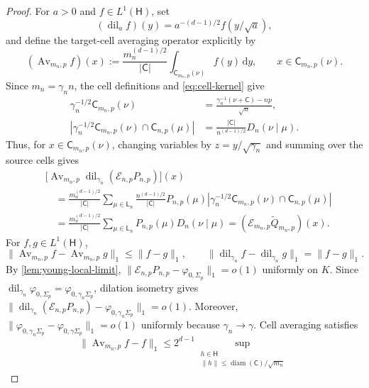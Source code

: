 \documentclass[11pt]{article}
\theoremstyle{remark}
\theoremstyle{plain}
\newcommand{\dd}{\mathrm d}
\begin{document}
\begin{proof}
For \(a>0\) and \(f\in L^1(\mathsf H)\), set
\[
  (\operatorname{dil}_a f)(y)=a^{-(d-1)/2}f(y/\sqrt a),
\]
and define the target-cell averaging operator explicitly by
\[
  (\operatorname{Av}_{m_n,p}f)(x)
  :=\frac{m_n^{(d-1)/2}}{|\mathsf C|}
   \int_{\mathsf C_{m_n,p}(\nu)}f(y)\,\dd y,
  \qquad x\in\mathsf C_{m_n,p}(\nu).
\]
Since \(m_n=\gamma_n n\), the cell definitions and
\eqref{eq:cell-kernel} give
\[
\begin{aligned}
  \gamma_n^{-1/2}\mathsf C_{m_n,p}(\nu)
  &=\frac{\gamma_n^{-1}(\nu+\mathsf C)-np}{\sqrt n},\\
  \left|\gamma_n^{-1/2}\mathsf C_{m_n,p}(\nu)
       \cap\mathsf C_{n,p}(\mu)\right|
  &=\frac{|\mathsf C|}{n^{(d-1)/2}}D_n(\nu\mid\mu).
\end{aligned}
\]
Thus, for \(x\in\mathsf C_{m_n,p}(\nu)\), changing variables
by \(z=y/\sqrt{\gamma_n}\) and summing over the source cells gives
\begin{equation}\label{eq:rounding-intertwining}
\begin{aligned}
 &\bigl[\operatorname{Av}_{m_n,p}\operatorname{dil}_{\gamma_n}
   (\mathcal E_{n,p}P_{n,p})\bigr](x)\\
 &\quad=\frac{m_n^{(d-1)/2}}{|\mathsf C|}
   \sum_{\mu\in\mathsf L_n}\frac{n^{(d-1)/2}}{|\mathsf C|}
   P_{n,p}(\mu)
   \left|\gamma_n^{-1/2}\mathsf C_{m_n,p}(\nu)
        \cap\mathsf C_{n,p}(\mu)\right|\\
 &\quad=\frac{m_n^{(d-1)/2}}{|\mathsf C|}
   \sum_{\mu\in\mathsf L_n}P_{n,p}(\mu)D_n(\nu\mid\mu)
  =(\mathcal E_{m_n,p}\widetilde Q_{m_n,p})(x).
\end{aligned}
\end{equation}
For \(f,g\in L^1(\mathsf H)\),
\[
  \|\operatorname{Av}_{m_n,p}f-\operatorname{Av}_{m_n,p}g\|_1
  \le\|f-g\|_1,
  \qquad
  \|\operatorname{dil}_{\gamma_n}f
      -\operatorname{dil}_{\gamma_n}g\|_1
  =\|f-g\|_1.
\]
By \cref{lem:young-local-limit},
\(\|\mathcal E_{n,p}P_{n,p}-\varphi_{0,\Sigma_p}\|_1=o(1)\) uniformly on
\(K\).  Since
\(\operatorname{dil}_{\gamma_n}\varphi_{0,\Sigma_p}
=\varphi_{0,\gamma_n\Sigma_p}\), dilation isometry gives
\(\|\operatorname{dil}_{\gamma_n}(\mathcal E_{n,p}P_{n,p})
-\varphi_{0,\gamma_n\Sigma_p}\|_1=o(1)\).  Moreover,
\(\|\varphi_{0,\gamma_n\Sigma_p}-\varphi_{0,\gamma\Sigma_p}\|_1=o(1)\)
uniformly because \(\gamma_n\to\gamma\).  Cell averaging satisfies
\[
  \|\operatorname{Av}_{m_n,p}f-f\|_1
  \le 2^{d-1}\!\sup_{\substack{h\in\mathsf H\\
       \|h\|\le\operatorname{diam}(\mathsf C)/\sqrt{m_n}}}
\]
\end{proof}
\end{document}
